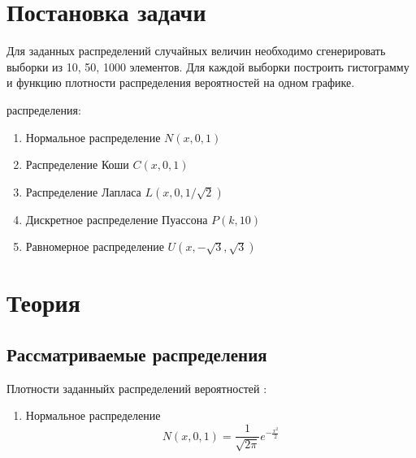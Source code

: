 \documentclass[12pt]{article}
\newcommand{\lskip}{\hfill\break}
\begin{document}
\begin{flushleft}

\setlength{\parindent}{1cm}

\tableofcontents

\newpage

\listoffigures

\newpage

\section{Постановка задачи}

Для заданных распределений случайных величин необходимо сгенерировать выборки из 10, 50, 1000 элементов. Для каждой выборки построить гистограмму и функцию плотности распределения вероятностей на одном графике.
\lskip

 распределения:

\begin{enumerate}
    \item Нормальное распределение $N(x, 0, 1)$
    \item Распределение Коши $C(x, 0, 1)$
    \item Распределение Лапласа $L(x, 0, 1/\sqrt{2})$
    \item Дискретное распределение Пуассона $P(k, 10)$
    \item Равномерное распределение $U(x, -\sqrt{3}, \sqrt{3})$
\end{enumerate}

\newpage

\section{Теория}

    \subsection{Рассматриваемые распределения}

        Плотности заданныйх распределений вероятностей \cite{theory}:

        \begin{enumerate}
            \item Нормальное распределение 
            \begin{equation}
                N(x, 0, 1) = \frac{1}{\sqrt{2\pi}}e^{-\frac{x^2}{2}}
                \label{normal}
            \end{equation}


\end{enumerate}
\end{flushleft}
\end{document}
